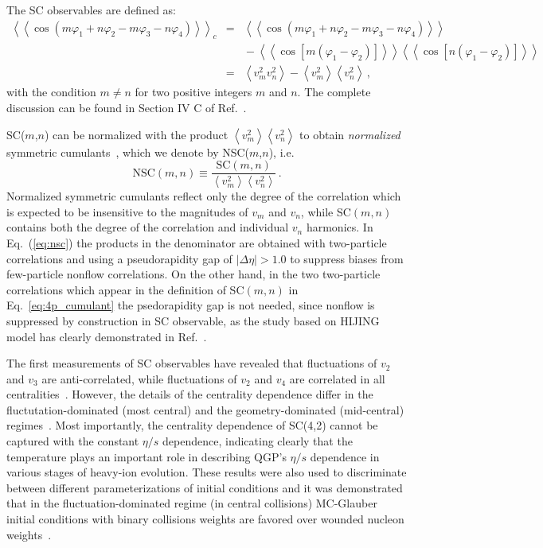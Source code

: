 The SC observables are defined as:
\begin{eqnarray}
\left<\left<\cos(m\varphi_1\!+\!n\varphi_2\!-\!m\varphi_3-\!n\varphi_4)\right>\right>_c &=& \left<\left<\cos(m\varphi_1\!+\!n\varphi_2\!-\!m\varphi_3-\!n\varphi_4)\right>\right>\nonumber\\
&&{}-\left<\left<\cos[m(\varphi_1\!-\!\varphi_2)]\right>\right>\left<\left<\cos[n(\varphi_1\!-\!\varphi_2)]\right>\right>\nonumber\\
&=&\left<v_{m}^2v_{n}^2\right>-\left<v_{m}^2\right>\left<v_{n}^2\right>\,,%
\label{eq:4p_cumulant}
\end{eqnarray}
%
with the condition $m\neq n$ for two positive integers $m$ and $n$. The complete discussion can be found in Section IV C of Ref.~\cite{Bilandzic:2013kga}.

SC($m$,$n$) can be normalized with the product $\left<v_{m}^2\right>\left<v_{n}^2\right>$ to obtain \textit{normalized} symmetric cumulants~\cite{ALICE:2016kpq,Giacalone:2016afq}, which we denote by NSC($m$,$n$), i.e.
%
\begin{equation}
\mathrm{NSC}(m,n) \equiv \frac{\mathrm{SC}(m,n)}{\left<v_{m}^2\right>\left<v_{n}^2\right>}\,.
\label{eq:nsc}
\end{equation}
%
Normalized symmetric cumulants reflect only the degree of the correlation which is expected to be insensitive to the magnitudes of $v_{m}$ and $v_{n}$, while SC$(m,n)$ contains both the degree of the correlation and individual $v_{n}$ harmonics. In Eq.~(\ref{eq:nsc}) the products in the denominator are obtained with two-particle correlations and using a pseudorapidity gap of $|\Delta\eta|>1.0$ to suppress biases from few-particle nonflow correlations. On the other hand, in the two two-particle correlations which appear in the definition of SC$(m,n)$ in Eq.~\ref{eq:4p_cumulant} the psedorapidity gap is not needed, since nonflow is suppressed by construction in SC observable, as the study based on HIJING model has clearly demonstrated in Ref.~\cite{ALICE:2016kpq}.

The first measurements of SC observables have revealed that fluctuations of $v_2$ and $v_3$ are anti-correlated, while fluctuations of $v_2$ and $v_4$ are correlated in all centralities~\cite{ALICE:2016kpq}. However, the details of the centrality dependence differ in the fluctutation-dominated (most central) and the geometry-dominated (mid-central) regimes~\cite{ALICE:2016kpq}. Most importantly, the centrality dependence of SC(4,2) cannot be captured with the constant $\eta/s$ dependence, indicating clearly that the temperature plays an important role in describing QGP's $\eta/s$ dependence in various stages of heavy-ion evolution. These results were also used to discriminate between different parameterizations of initial conditions and it was demonstrated that in the fluctuation-dominated regime (in central collisions) MC-Glauber initial conditions with binary collisions weights are favored over wounded nucleon weights~\cite{ALICE:2016kpq}. 

